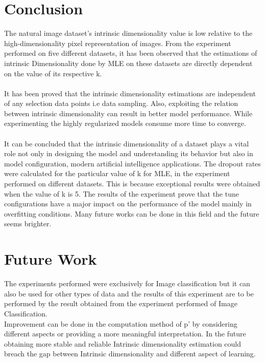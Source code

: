 \documentclass[12pt,letterpaper]{report}
\begin{document}
\section{Conclusion}
The natural image dataset's intrinsic dimensionality value is low relative to the high-dimensionality pixel representation of images. From the experiment performed on five different datasets, it has been observed that the estimations of intrinsic Dimensionality done by MLE on these datasets are directly dependent on the value of its respective k.\\\\
It has been proved that the intrinsic dimensionality estimations are independent of any selection data points i.e data sampling\cite{13}. Also, exploiting the relation between intrinsic dimensionality can result in better model performance. While experimenting the highly regularized models consume more time to converge.\\\\
It can be concluded that the intrinsic dimensionality of a dataset plays a vital role not only in designing the model and understanding its behavior but also in model configuration, modern artificial intelligence applications. The dropout rates were calculated for the particular value of k for MLE, in the experiment performed on different datasets. This is because exceptional results were obtained when the value of k is 5. The results of the experiment prove that the tune configurations have a major impact on the performance of the model mainly in overfitting conditions. Many future works can be done in this field and the future seems brighter.

\section{Future Work}
The experiments performed were exclusively for Image classification but it can also be used for other types of data and the results of this experiment are to be performed by the result obtained from the experiment performed of Image Classification. 
\\

Improvement can be done in the computation method of p' by considering different aspects or providing a more meaningful interpretation. In the future obtaining more stable and reliable Intrinsic dimensionality estimation could breach the gap between Intrinsic dimensionality and different aspect of learning. 

\newpage
\end{document}
